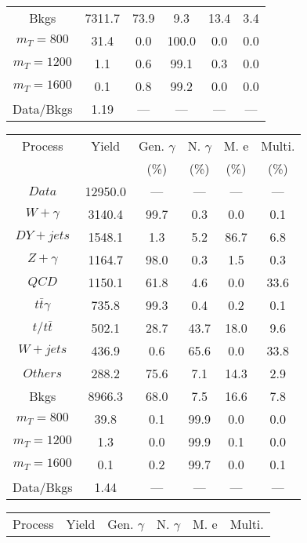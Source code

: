 \begin{figure}
\begin{minipage}[c]{0.32\textwidth}
{\begin{tabular}{cccccc}
Bkgs &  7311.7 &  73.9 &  9.3 &  13.4 &  3.4\\
$ m_{T} = 800 $ &  31.4 &  0.0 &  100.0 &  0.0 &  0.0\\
$ m_{T} = 1200 $ &  1.1 &  0.6 &  99.1 &  0.3 &  0.0\\
$ m_{T} = 1600 $ &  0.1 &  0.8 &  99.2 &  0.0 &  0.0\\
Data/Bkgs &  1.19 &  --- &  --- &  --- &  ---\\
\hline
\end{tabular}
}
\end{minipage}
\begin{minipage}[c]{0.32\textwidth}
\centering
\tiny{
\begin{tabular}{cccccc}
\hline
Process & Yield & Gen. $\gamma$ & N. $\gamma$ & M. e & Multi. \\
 &  & (\%) & (\%) & (\%) & (\%)  \\
\hline
                                                                      $ Data $ &  12950.0 &  --- &  --- &  --- &  ---\\
$ W+\gamma $ &  3140.4 &  99.7 &  0.3 &  0.0 &  0.1\\
$ DY+jets $ &  1548.1 &  1.3 &  5.2 &  86.7 &  6.8\\
$ Z+\gamma $ &  1164.7 &  98.0 &  0.3 &  1.5 &  0.3\\
$ QCD $ &  1150.1 &  61.8 &  4.6 &  0.0 &  33.6\\
$ t\bar{t}\gamma $ &  735.8 &  99.3 &  0.4 &  0.2 &  0.1\\
$ t/t\bar{t} $ &  502.1 &  28.7 &  43.7 &  18.0 &  9.6\\
$ W+jets $ &  436.9 &  0.6 &  65.6 &  0.0 &  33.8\\
$ Others $ &  288.2 &  75.6 &  7.1 &  14.3 &  2.9\\
Bkgs &  8966.3 &  68.0 &  7.5 &  16.6 &  7.8\\
$ m_{T} = 800 $ &  39.8 &  0.1 &  99.9 &  0.0 &  0.0\\
$ m_{T} = 1200 $ &  1.3 &  0.0 &  99.9 &  0.1 &  0.0\\
$ m_{T} = 1600 $ &  0.1 &  0.2 &  99.7 &  0.0 &  0.1\\
Data/Bkgs &  1.44 &  --- &  --- &  --- &  ---\\
\hline
\end{tabular}
}
\end{minipage}
\begin{minipage}[c]{0.32\textwidth}
\centering
\tiny{
\begin{tabular}{cccccc}
\hline
Process & Yield & Gen. $\gamma$ & N. $\gamma$ & M. e & Multi. \\

\end{tabular}}
\end{minipage}
\end{figure}
